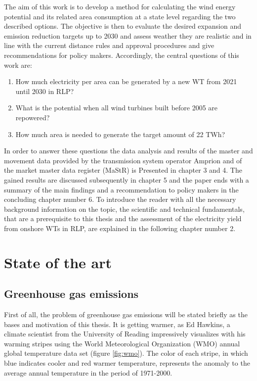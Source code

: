 \documentclass[a4paper,11pt]{article}
\begin{document}
The aim of this work is to develop a method for calculating the wind energy potential and its related area consumption at a state level regarding the two described options. The objective is then to evaluate the desired expansion and emission reduction targets up to 2030 and assess weather they are realistic and in line with the current distance rules and approval procedures and give recommendations for policy makers. Accordingly, the central questions of this work are:
\begin{enumerate}
\def\labelenumi{\arabic{enumi}.}
\item
  How much electricity per area can be generated by a new WT from 2021 until 2030 in RLP?
\item
  What is the potential when all wind turbines built before 2005 are repowered?
\item
  How much area is needed to generate the target amount of 22 TWh?
\end{enumerate}
In order to answer these questions the data analysis and results of the master and movement data provided by the transmission system operator Amprion and of the market master data register (MaStR) is Presented in chapter 3 and 4. The gained results are discussed subsequently in chapter 5 and the paper ends with a summary of the main findings and a recommendation to policy makers in the concluding chapter number 6. To introduce the reader with all the necessary background information on the topic, the scientific and technical fundamentals, that are a prerequisite to this thesis and the assessment of the electricity yield from onshore WTs in RLP, are explained in the following chapter number 2.

\newpage

\hypertarget{state-of-the-art}{%
\section{State of the art}\label{state-of-the-art}}

\hypertarget{greenhouse-gas-emissions}{%
\subsection{Greenhouse gas emissions}\label{greenhouse-gas-emissions}}

First of all, the problem of greenhouse gas emissions will be stated briefly as the bases and motivation of this thesis. It is getting warmer, as Ed Hawkins, a climate scientist from the University of Reading impressively visualizes with his warming stripes using the World Meteorological Organization (WMO) annual global temperature data set (figure \ref{fig:wmo}). The color of each stripe, in which blue indicates cooler and red warmer temperature, represents the anomaly to the average annual temperature in the period of 1971-2000.
\end{document}
